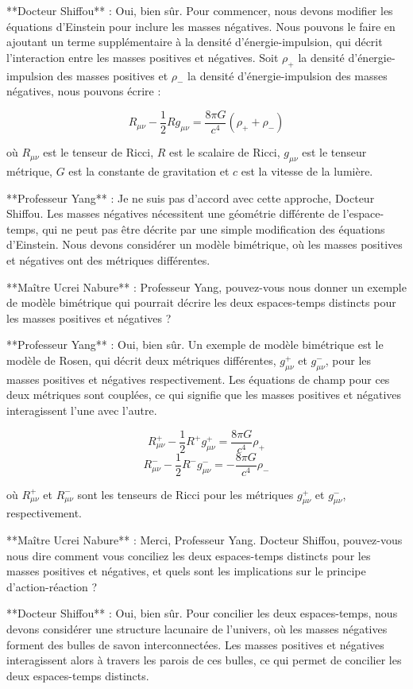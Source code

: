 **Docteur Shiffou** : Oui, bien sûr. Pour commencer, nous devons modifier les équations d'Einstein pour inclure les masses négatives. Nous pouvons le faire en ajoutant un terme supplémentaire à la densité d'énergie-impulsion, qui décrit l'interaction entre les masses positives et négatives. Soit $\rho_+$ la densité d'énergie-impulsion des masses positives et $\rho_-$ la densité d'énergie-impulsion des masses négatives, nous pouvons écrire :

$$R_{\mu\nu} - \frac{1}{2}Rg_{\mu\nu} = \frac{8\pi G}{c^4}(\rho_+ + \rho_-)$$

où $R_{\mu\nu}$ est le tenseur de Ricci, $R$ est le scalaire de Ricci, $g_{\mu\nu}$ est le tenseur métrique, $G$ est la constante de gravitation et $c$ est la vitesse de la lumière.

**Professeur Yang** : Je ne suis pas d'accord avec cette approche, Docteur Shiffou. Les masses négatives nécessitent une géométrie différente de l'espace-temps, qui ne peut pas être décrite par une simple modification des équations d'Einstein. Nous devons considérer un modèle bimétrique, où les masses positives et négatives ont des métriques différentes.

**Maître Ucrei Nabure** : Professeur Yang, pouvez-vous nous donner un exemple de modèle bimétrique qui pourrait décrire les deux espaces-temps distincts pour les masses positives et négatives ?

**Professeur Yang** : Oui, bien sûr. Un exemple de modèle bimétrique est le modèle de Rosen, qui décrit deux métriques différentes, $g_{\mu\nu}^+$ et $g_{\mu\nu}^-$, pour les masses positives et négatives respectivement. Les équations de champ pour ces deux métriques sont couplées, ce qui signifie que les masses positives et négatives interagissent l'une avec l'autre.

$$R_{\mu\nu}^+ - \frac{1}{2}R^+g_{\mu\nu}^+ = \frac{8\pi G}{c^4}\rho_+$$
$$R_{\mu\nu}^- - \frac{1}{2}R^-g_{\mu\nu}^- = -\frac{8\pi G}{c^4}\rho_-$$

où $R_{\mu\nu}^+$ et $R_{\mu\nu}^-$ sont les tenseurs de Ricci pour les métriques $g_{\mu\nu}^+$ et $g_{\mu\nu}^-$, respectivement.

**Maître Ucrei Nabure** : Merci, Professeur Yang. Docteur Shiffou, pouvez-vous nous dire comment vous conciliez les deux espaces-temps distincts pour les masses positives et négatives, et quels sont les implications sur le principe d'action-réaction ?

**Docteur Shiffou** : Oui, bien sûr. Pour concilier les deux espaces-temps, nous devons considérer une structure lacunaire de l'univers, où les masses négatives forment des bulles de savon interconnectées. Les masses positives et négatives interagissent alors à travers les parois de ces bulles, ce qui permet de concilier les deux espaces-temps distincts.


